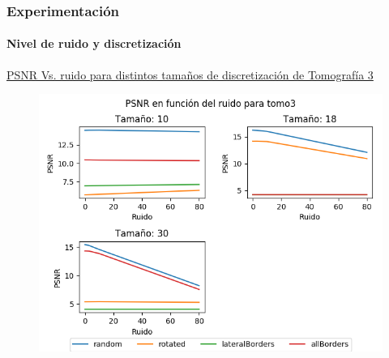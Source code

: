 \documentclass{beamer}
\begin{document}

\begin{frame}
  \frametitle{Experimentación}
  \framesubtitle{Nivel de ruido y discretización}
  \underline{PSNR Vs. ruido para distintos tamaños de discretización de Tomografía 3}
  \begin{figure}[H]
    \centering
    \includegraphics[height=0.75\textheight]{../graficos/noise/tomo3/noise_graph.png}
  \end{figure}
\end{frame}

\end{document}
